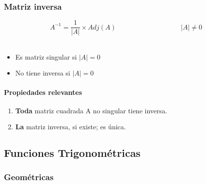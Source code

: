 \documentclass[stu, 12pt, a4paper, donotrepeattitle, floatsintext, natbib]{apa7}
\begin{document}
    \subsubsection{Matriz inversa}
    \[A^{-1}=\frac{1}{|A|} \times {Adj}(A) \hspace{4cm} |A|\neq 0 \]\\[0.5cm]
    \begin{itemize}
        \item Es matriz singular si $|A|=0$
        \item No tiene inversa si $|A|=0$
    \end{itemize}

    \paragraph{Propiedades relevantes}
    \begin{enumerate}
        \item \textbf{Toda} matriz cuadrada A no singular tiene inversa.
        \item \textbf{La} matriz inversa, si existe; es única.
    \end{enumerate}

    \newpage

    \subsection{Funciones Trigonométricas}\label{subsec:funciones-trigonometricas}

    \subsubsection{Geométricas}
\end{document}
